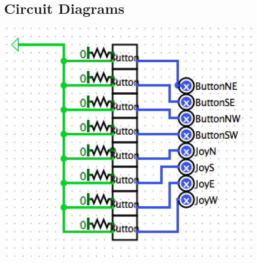 \documentclass[letterpaper]{article} %
\begin{document}
\section{Circuit Diagrams}
	\begin{center}
		\includegraphics[scale=.8]{controller_diagram}
	\end{center}\par
	
\end{document}
